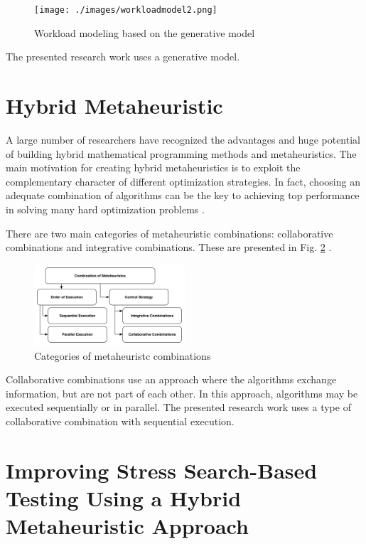 \documentclass[conference]{IEEEtran}
\begin{document}
\begin{figure}[!ht]
\centering
\texttt{[image: ./images/workloadmodel2.png]}
\caption{Workload modeling based on the generative model \cite{DiLucca2006}}
\label{fig:generativemodel}
\end{figure}

The presented research work uses a generative model.

\section{Hybrid  Metaheuristic}


A large number of researchers have recognized the advantages and huge potential of building hybrid mathematical programming methods and metaheuristics. The main motivation for creating hybrid metaheuristics is to exploit the complementary character of different optimization strategies. In fact, choosing an adequate combination of algorithms can be the key to achieving top performance in solving many hard optimization problems \cite{Puchinger2005} \cite{Blum2012}.

There are two main categories of metaheuristic combinations: collaborative combinations and integrative combinations. These are presented in Fig. \ref{fig:metaheuristc} \cite{Raidl2006}.

\begin{figure}[h]
\includegraphics[width=0.5\textwidth]{./images/metaheuristc2.png}
\caption{Categories of metaheuristc combinations \cite{Puchinger2005} }
\label{fig:metaheuristc}
\end{figure}

Collaborative combinations use an approach where the algorithms exchange information, but are not part of each other. In this approach, algorithms may be executed sequentially or in parallel. The presented research work uses a type of collaborative combination with sequential execution.


\section{Improving Stress Search-Based Testing Using a Hybrid Metaheuristic Approach}
\end{document}
